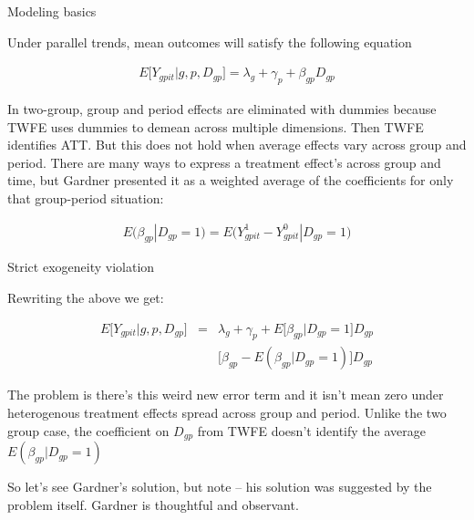 \documentclass{beamer}
\begin{document}
\begin{frame}{Modeling basics}

Under parallel trends, mean outcomes will satisfy the following equation

\bigskip

\begin{eqnarray*}
E \bigg [ Y_{gpit} | g,p,D_{gp} \bigg ] = \lambda_g + \gamma_p + \beta_{gp} D_{gp}
\end{eqnarray*}

\bigskip

In two-group, group and period effects are eliminated with dummies because TWFE uses dummies to demean across multiple dimensions. Then TWFE identifies ATT.  But this does not hold when average effects vary across group and period. There are many ways to express a treatment effect's across group and time, but Gardner presented it as a weighted average of the coefficients for only that group-period situation:

\begin{eqnarray*}
E \bigg (\beta_{gp} | D_{gp}=1 \bigg ) = E \bigg (Y^1_{gpit} - Y^0_{gpit} | D_{gp}=1 \bigg )
\end{eqnarray*}

\end{frame}


\begin{frame}{Strict exogeneity violation}

Rewriting the above we get:

\begin{eqnarray*}
E \bigg [ Y_{gpit} | g,p, D_{gp} \bigg ] &=& \lambda_g + \gamma_p + E \bigg [\beta_{gp} | D_{gp} =1 \bigg ] D_{gp} \\
&& \bigg [\beta_{gp} - E ( \beta_{gp} | D_{gp} = 1 ) \bigg ] D_{gp}
\end{eqnarray*}

\bigskip

The problem is there's this weird new error term and it isn't mean zero under heterogenous treatment effects spread across group and period.  Unlike the two group case, the coefficient on $D_{gp}$ from TWFE doesn't identify the average $E(\beta_{gp} | D_{gp}=1)$ 

\bigskip

So let's see Gardner's solution, but note -- his solution was suggested by the problem itself. Gardner is thoughtful and observant.

\end{frame}
\end{document}
